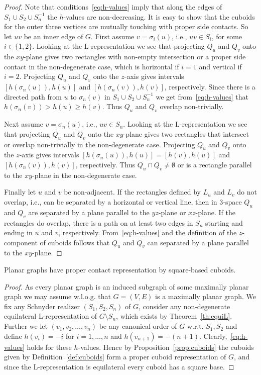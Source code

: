 \documentclass{llncs}
\begin{document}
\begin{proof}
Note that conditions~\eqref{eq:h-values} imply that along the edges of $S_1 \cup S_2 \cup S_n^{-1}$ the $h$-values are non-decreasing.
It is easy to show that the cuboids for the outer three vertices are mutually touching with proper side contacts. So let $uv$ be an inner edge of $G$. First assume $v = \sigma_i(u)$, i.e., $uv \in S_i$, for some $i \in \{1,2\}$. Looking at the L-representation we see that projecting $Q_u$ and $Q_v$ onto the $xy$-plane gives two rectangles with non-empty intersection or a proper side contact in the non-degenerate case, which is horizontal if $i=1$ and vertical if $i=2$. Projecting $Q_u$ and $Q_v$ onto the $z$-axis gives intervals $[h(\sigma_n(u)),h(u)]$ and $[h(\sigma_n(v)),h(v)]$, respectively. Since there is a directed path from $u$ to $\sigma_n(v)$ in $S_1 \cup S_2 \cup S_n^{-1}$ we get from~\eqref{eq:h-values} that $h(\sigma_n(v)) > h(u) \geq h(v)$. Thus $Q_u$ and $Q_v$ overlap non-trivially.
 
 Next assume $v = \sigma_n(u)$, i.e., $uv \in S_n$. Looking at the L-representation we see that projecting $Q_u$ and $Q_v$ onto the $xy$-plane gives two rectangles that intersect or overlap non-trivially in the non-degenerate case. Projecting $Q_u$ and $Q_v$ onto the $z$-axis gives intervals $[h(\sigma_n(u)),h(u)] = [h(v),h(u)]$ and $[h(\sigma_n(v)),h(v)]$, respectively. Thus $Q_u \cap Q_v \neq \emptyset$ or is a rectangle parallel to the $xy$-plane in the non-degenerate case.
  
 Finally let $u$ and $v$ be non-adjacent. If the rectangles defined by $L_u$ and $L_v$ do not overlap, i.e., can be separated by a horizontal or vertical line, then in $3$-space $Q_u$ and $Q_v$ are separated by a plane parallel to the $yz$-plane or $xz$-plane. If the rectangles do overlap, there is a path on at least two edges in $S_n$ starting and ending in $u$ and $v$, respectively. From~\eqref{eq:h-values} and the definition of the $z$-component of cuboids follows that $Q_u$ and $Q_v$ can separated by a plane parallel to the $xy$-plane. 
\end{proof}

\begin{theorem}\label{thm:square-based}
 Planar graphs have proper contact representation by square-based cuboids.
\end{theorem}
\begin{proof}
 As every planar graph is an induced subgraph of some maximally planar graph we may assume w.l.o.g. that $G = (V,E)$ is a maximally planar graph. We fix any Schnyder realizer $(S_1,S_2,S_n)$ of $G$, consider any non-degenerate equilateral L-re\-pre\-sen\-ta\-tion of $G \setminus S_n$, which exists by Theorem~\ref{th:equiL}. Further we let $(v_1,v_2,\ldots,v_n)$ be any canonical order of $G$ w.r.t. $S_1,S_2$ and define $h(v_i) = -i$ for $i=1,\ldots,n$ and $h(v_{n+1}) = -(n+1)$. Clearly,~\eqref{eq:h-values} holds for these $h$-values. Hence by Proposition~\ref{prop:cuboids} the cuboids given by Definition~\ref{def:cuboids} form a proper cuboid representation of $G$, and since the L-representation is equilateral every cuboid has a square base.
\end{proof}
 
\end{document}
